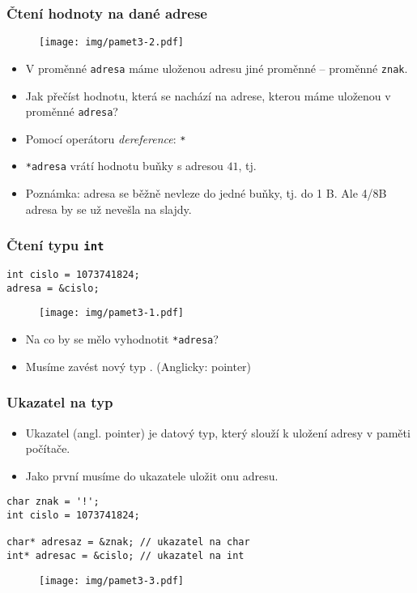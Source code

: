 \documentclass{beamer}
\newenvironment{itemize4}%
  {\large \begin{itemize}%
    \setlength{\itemsep}{4pt}%
    \setlength{\parskip}{4pt}}%
  {\end{itemize}}
\newenvironment{itemizex}%
  {\large \begin{itemize}%
    \setlength{\itemsep}{8pt}%
    \setlength{\parskip}{8pt}}%
  {\end{itemize}}
\begin{document}
\begin{frame}[t,fragile]\frametitle{Čtení hodnoty na dané adrese} 
\begin{figure}[htb]
    \centering
    \texttt{[image: img/pamet3-2.pdf]}
\end{figure}

\begin{itemize}
    \item V proměnné \texttt{adresa} máme uloženou adresu jiné proměnné -- proměnné \texttt{znak}.
    \item Jak přečíst hodnotu, která se nachází na adrese, kterou máme uloženou v proměnné \texttt{adresa}?
    \item Pomocí operátoru \textit{dereference}: \texttt{*}
    \item \texttt{*adresa} vrátí hodnotu buňky s adresou $41$, tj. \uv{!}
    \item {\tiny Poznámka: adresa se běžně nevleze do jedné buňky, tj. do 1 B. Ale 4/8B adresa by se už nevešla na slajdy.}
\end{itemize}
\end{frame}



\begin{frame}[t,fragile]\frametitle{Čtení typu \texttt{int}} 
\begin{verbatim} 
int cislo = 1073741824; 
adresa = &cislo;
\end{verbatim}

\begin{figure}[htb]
    \centering
    \texttt{[image: img/pamet3-1.pdf]}
\end{figure}

\begin{itemizex}
    \item Na co by se mělo vyhodnotit \texttt{*adresa}?
    \item Musíme zavést nový typ . (Anglicky: pointer)
\end{itemizex}
\end{frame}


\begin{frame}[t,fragile]\frametitle{Ukazatel na typ} 
\begin{itemize4}
    \item Ukazatel (angl. pointer) je datový typ, který slouží k uložení adresy v paměti počítače. 
    \item Jako první musíme do ukazatele uložit onu adresu. 
\end{itemize4}
\begin{verbatim} 
char znak = '!';
int cislo = 1073741824;

char* adresaz = &znak; // ukazatel na char
int* adresac = &cislo; // ukazatel na int
\end{verbatim}
\begin{figure}[htb]
    \centering
    \texttt{[image: img/pamet3-3.pdf]}
\end{figure}
\end{frame}
\end{document}
